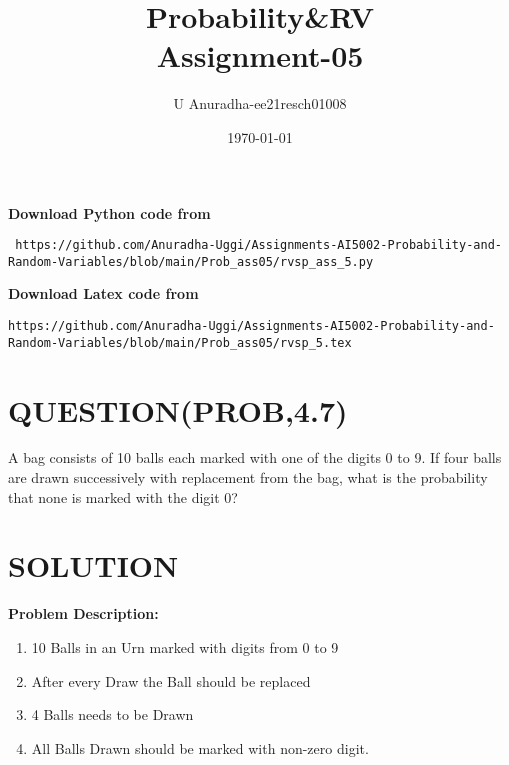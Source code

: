 \documentclass[journal,12pt,twocolumn]{IEEEtran}
\title{Probability\&RV \\ Assignment-05}
\author{U Anuradha-ee21resch01008}
\date{\today}
\begin{document}
\maketitle
\newpage
\bigskip
\renewcommand{\thefigure}{\theenumi}
\renewcommand{\thetable}{\theenumi}
\textbf{Download Python code from}
\begin{lstlisting}
 https://github.com/Anuradha-Uggi/Assignments-AI5002-Probability-and-Random-Variables/blob/main/Prob_ass05/rvsp_ass_5.py
\end{lstlisting}
\textbf{Download Latex code from}
\begin{lstlisting}
https://github.com/Anuradha-Uggi/Assignments-AI5002-Probability-and-Random-Variables/blob/main/Prob_ass05/rvsp_5.tex
\end{lstlisting}
\section{\textbf{QUESTION(PROB,4.7)}}
A bag consists of 10 balls each marked with one of the digits 0 to 9. If four balls are drawn successively with replacement from the bag,
what is the probability that none is marked with the digit 0?
\section{\textbf{SOLUTION}}
\textbf{Problem  Description:}
\begin{enumerate}
    \item  10 Balls in an Urn  marked with  digits from 0 to 9\\
    \item After every Draw the Ball should be replaced  \\
    \item 4 Balls needs to be Drawn\\
    \item All Balls Drawn should be marked with non-zero digit.\\
\end{enumerate}
  
\end{document}
